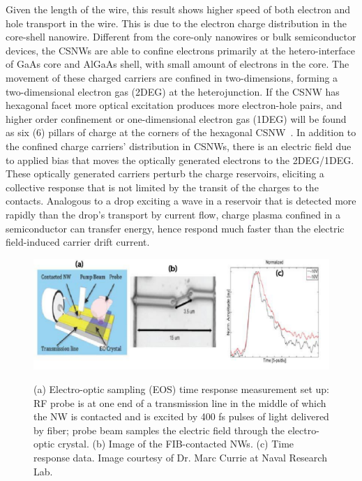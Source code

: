 Given the length of the wire, this result shows higher speed of both electron
and hole transport in the wire. This is due to the electron charge distribution
in the core-shell nanowire. Different from the core-only nanowires or bulk
semiconductor devices, the CSNWs are able to confine electrons primarily at the
hetero-interface of GaAs core and AlGaAs shell, with small amount of electrons
in the core. The movement of these charged carriers are confined in
two-dimensions, forming a two-dimensional electron gas (2DEG) at the
heterojunction. If the CSNW has hexagonal facet more optical excitation
produces more electron-hole pairs, and higher order confinement or
one-dimensional electron gas (1DEG) will be found as six (6) pillars of charge
at the corners of the hexagonal CSNW~\cite{Wang:2015hz}. In addition to the
confined charge carriers' distribution in CSNWs, there is an electric field due
to applied bias that moves the optically generated electrons to the 2DEG/1DEG.
These optically generated carriers perturb the charge reservoirs, eliciting a
collective response that is not limited by the transit of the charges to the
contacts. Analogous to a drop exciting a wave in a reservoir that is detected
more rapidly than the drop's transport by current flow, charge plasma confined
in a semiconductor can transfer energy, hence respond much faster than the
electric field-induced carrier drift current.

\begin{figure}
  \caption{(a) Electro-optic sampling (EOS) time response measurement set up: RF probe is at one end of a transmission line in the middle of which the NW is contacted and is excited by 400 fs pulses of light delivered by fiber; probe beam samples the electric field through the electro-optic crystal. (b) Image of the FIB-contacted NWs. (c) Time response data. Image courtesy of Dr. Marc Currie at Naval Research Lab.}
  \centering
  \includegraphics[width=\textwidth]{pictures/Data/NWEOS}
  \label{NWEOS}
\end{figure}

